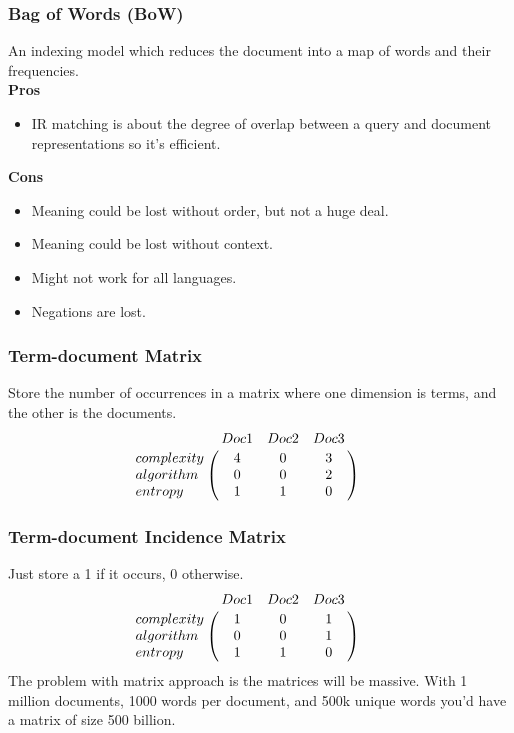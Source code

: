 \documentclass[11pt]{article}
\begin{document}
\subsubsection{Bag of Words (BoW)}
An indexing model which reduces the document into a map of words and their frequencies.\\
\newline
\textbf{Pros}
\begin{itemize}
    \item IR matching is about the degree of overlap between a query and document representations so it's efficient.
\end{itemize}
\textbf{Cons}
\begin{itemize}
    \item Meaning could be lost without order, but not a huge deal.
    \item Meaning could be lost without context.
    \item Might not work for all languages.
    \item Negations are lost.
\end{itemize}

\subsubsection{Term-document Matrix}
Store the number of occurrences in a matrix where one dimension is terms, and the other is the documents.
\[
\bordermatrix{ & Doc1 & Doc2 & Doc3 \cr
      complexity & 4 & 0 & 3 \cr
      algorithm & 0 & 0 & 2 \cr
      entropy & 1 & 1 & 0 } \qquad
\]

\subsubsection{Term-document Incidence Matrix}
Just store a 1 if it occurs, 0 otherwise.
\[
\bordermatrix{ & Doc1 & Doc2 & Doc3 \cr
      complexity & 1 & 0 & 1 \cr
      algorithm & 0 & 0 & 1 \cr
      entropy & 1 & 1 & 0 } \qquad
\]
\newline\newline
The problem with matrix approach is the matrices will be massive. With 1 million documents, 1000 words per document, and 500k unique words you'd have a matrix of size 500 billion.
\end{document}
